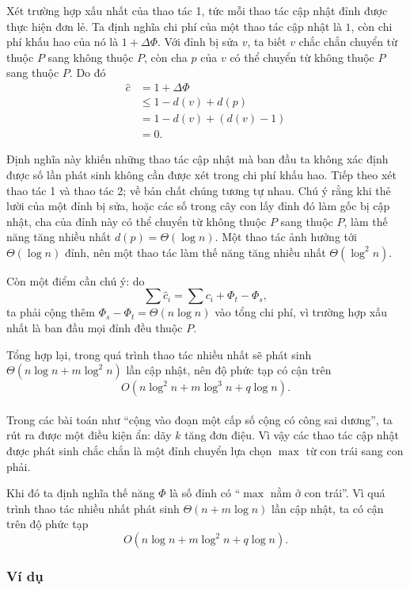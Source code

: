 \documentclass[11pt]{article}
\begin{document}
Xét trường hợp xấu nhất của thao tác 1, tức mỗi thao tác cập nhật đỉnh được thực
hiện đơn lẻ. Ta định nghĩa chi phí của một thao tác cập nhật là \(1\), còn chi
phí khấu hao của nó là \(1+\Delta\Phi\). Với đỉnh bị sửa \(v\), ta biết \(v\)
chắc chắn chuyển từ thuộc \(P\) sang không thuộc \(P\), còn cha \(p\) của \(v\)
có thể chuyển từ không thuộc \(P\) sang thuộc \(P\). Do đó
\[
\begin{aligned}
\hat c &= 1+\Delta\Phi\\
&\le 1-d(v)+d(p)\\
&=1-d(v)+(d(v)-1)\\
&=0.
\end{aligned}
\]

Định nghĩa này khiến những thao tác cập nhật mà ban đầu ta không xác định được
số lần phát sinh không cần được xét trong chi phí khấu hao. Tiếp theo xét thao
tác 1 và thao tác 2; về bản chất chúng tương tự nhau. Chú ý rằng khi thẻ lười
của một đỉnh bị sửa, hoặc các số trong cây con lấy đỉnh đó làm gốc bị cập nhật,
cha của đỉnh này có thể chuyển từ không thuộc \(P\) sang thuộc \(P\), làm thế
năng tăng nhiều nhất \(d(p)=\Theta(\log n)\). Một thao tác ảnh hưởng tới
\(\Theta(\log n)\) đỉnh, nên một thao tác làm thế năng tăng nhiều nhất
\(\Theta(\log^2 n)\).

Còn một điểm cần chú ý: do
\[
  \sum \hat c_i=\sum c_i+\Phi_t-\Phi_s,
\]
ta phải cộng thêm \(\Phi_s-\Phi_t=\Theta(n\log n)\) vào tổng chi phí, vì trường
hợp xấu nhất là ban đầu mọi đỉnh đều thuộc \(P\).

Tổng hợp lại, trong quá trình thao tác nhiều nhất sẽ phát sinh
\(\Theta(n\log n+m\log^2 n)\) lần cập nhật, nên độ phức tạp có cận trên
\[
  O(n\log^2 n+m\log^3 n+q\log n).
\]

\paragraph{}
Trong các bài toán như ``cộng vào đoạn một cấp số cộng có công sai dương'', ta
rút ra được một điều kiện ẩn: dãy \(k\) tăng đơn điệu. Vì vậy các thao tác cập
nhật được phát sinh chắc chắn là một đỉnh chuyển lựa chọn \(\max\) từ con trái
sang con phải.

Khi đó ta định nghĩa thế năng \(\Phi\) là số đỉnh có ``\(\max\) nằm ở con
trái''. Vì quá trình thao tác nhiều nhất phát sinh \(\Theta(n+m\log n)\) lần
cập nhật, ta có cận trên độ phức tạp
\[
  O(n\log n+m\log^2 n+q\log n).
\]

\subsubsection{Ví dụ}
\end{document}

